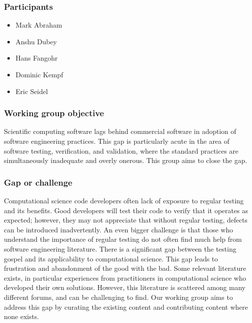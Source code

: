 \subsubsection{Participants}
\begin{itemize}
\item Mark Abraham
\item Anshu Dubey %
\item Hans Fangohr
\item Dominic Kempf
\item Eric Seidel
\end{itemize}

\subsubsection{Working group objective}
Scientific computing software lags behind commercial software in
adoption of software engineering practices. This
gap is particularly acute in the area of software testing,
verification, and validation, where the standard practices are
simultaneously inadequate and overly onerous.
This group aims to close the gap.

\subsubsection{Gap or challenge}
Computational science code developers often lack of exposure to
regular testing and its benefits. Good developers will test their code to
verify that it operates as expected; however, they may not appreciate
that without regular testing, defects can be introduced
inadvertently. An even bigger challenge is that those who understand
the importance of regular testing do not often find much help from
software engineering literature. There is a significant gap between
the testing gospel and its applicability to computational science. This
gap leads to frustration and abandonment of the good with the bad. Some
relevant literature exists, in particular experiences from
practitioners in computational science who developed their own
solutions. However, this literature is scattered among many different
forums, and can be challenging to find. Our working group aims to
address this gap by curating the existing content and contributing
content where none exists.

